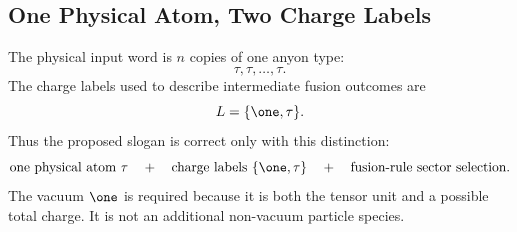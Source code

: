 
\subsection{One Physical Atom, Two Charge Labels}

The physical input word is \(n\) copies of one anyon type:
\[
  \tau,\tau,\ldots,\tau .
\]
The charge labels used to describe intermediate fusion outcomes are
\[
  L=\{\one,\tau\}.
\]
Thus the proposed slogan is correct only with this distinction:
\[
  \text{one physical atom } \tau
  \quad+\quad
  \text{charge labels } \{\one,\tau\}
  \quad+\quad
  \text{fusion-rule sector selection}.
\]
The vacuum \(\one\) is required because it is both the tensor unit and a possible
total charge.  It is not an additional non-vacuum particle species.

